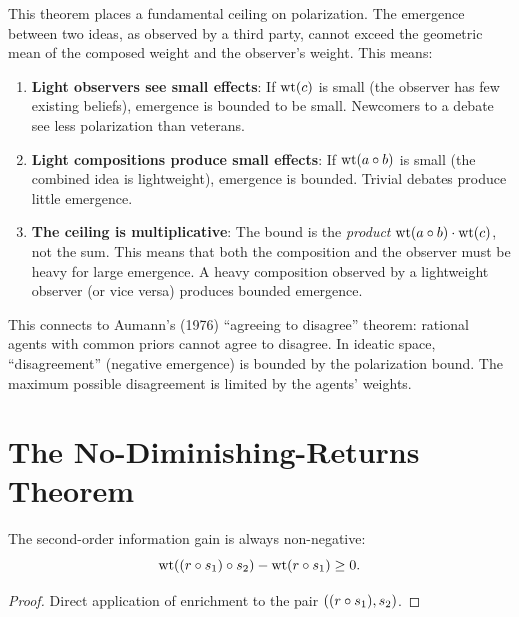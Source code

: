 \begin{interpretation}
This theorem places a fundamental ceiling on polarization. The emergence between two ideas, as observed by a third party, cannot exceed the geometric mean of the composed weight and the observer's weight. This means:

\begin{enumerate}
\item \textbf{Light observers see small effects}: If $\operatorname{wt}(c)$ is small (the observer has few existing beliefs), emergence is bounded to be small. Newcomers to a debate see less polarization than veterans.

\item \textbf{Light compositions produce small effects}: If $\operatorname{wt}(a \circ b)$ is small (the combined idea is lightweight), emergence is bounded. Trivial debates produce little emergence.

\item \textbf{The ceiling is multiplicative}: The bound is the \emph{product} $\operatorname{wt}(a \circ b) \cdot \operatorname{wt}(c)$, not the sum. This means that both the composition and the observer must be heavy for large emergence. A heavy composition observed by a lightweight observer (or vice versa) produces bounded emergence.
\end{enumerate}

This connects to Aumann's (1976) ``agreeing to disagree'' theorem: rational agents with common priors cannot agree to disagree. In ideatic space, ``disagreement'' (negative emergence) is bounded by the polarization bound. The maximum possible disagreement is limited by the agents' weights.
\end{interpretation}

\section{The No-Diminishing-Returns Theorem}

\begin{theorem}
\label{thm:no-diminishing-returns}
The second-order information gain is always non-negative:
\[
\operatorname{wt}((r \circ s_1) \circ s_2) - \operatorname{wt}(r \circ s_1) \geq 0.
\]
\end{theorem}

\begin{proof}
Direct application of enrichment to the pair $((r \circ s_1), s_2)$.
\end{proof}

